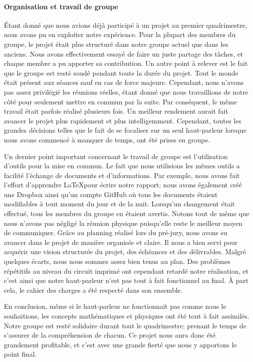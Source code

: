 \paragraph{Organisation et travail de groupe}
Étant donné que nous avions déjà participé à un projet au premier quadrimestre, nous avons pu en exploiter 
notre expérience.  Pour la plupart des membres du groupe, le projet était plus structuré dans notre groupe
actuel que dans les anciens. Nous avons effectivement essayé de faire un juste partage des tâches, et chaque
membre a pu apporter sa contribution. Un autre point à relever est le fait que le groupe est resté soudé 
pendant toute la durée du projet. Tout le monde était présent aux séances sauf en cas de force majeure. 
Cependant, nous n'avons pas assez privilégié les réunions réelles, étant donné que nous travaillions de notre
côté pour seulement mettre en commun par la suite. Par conséquent, le même travail était parfois réalisé
plusieurs fois. Un meilleur rendement aurait fait avancer le projet plus rapidement et plus intelligemment.
Cependant, toutes les grandes décisions telles que le fait de se focaliser sur un seul haut-parleur lorsque 
nous avons commencé à manquer de temps, ont été prises en groupe.

Un dernier point important concernant le travail de groupe est l'utilisation d'outils pour la mise en commun.
Le fait que nous utilisions les mêmes outils a facilité l’échange de documents et d’informations. 
Par exemple, nous avons fait l’effort d’apprendre \LaTeX pour écrire notre rapport; nous avons également créé
une Dropbox ainsi qu’un compte GitHub où tous les documents étaient modifiables à tout moment du jour et de 
la nuit. Lorsqu'un changement était effectué, tous les membres du groupe en étaient avertis. 
Notons tout de même que nous n'avons pas négligé la réunion physique puisqu'elle reste 
le meilleur moyen de communiquer. 
Grâce au planning réalisé lors du pré-jury, nous avons su avancer dans le projet de manière organisée et 
claire. Il nous a bien servi pour acquérir une vision structurée du projet, des échéances
et des délivrables. Malgré quelques écarts, nous nous sommes assez bien tenus au plan. Des problèmes répétitifs 
au niveau du circuit imprimé ont cependant retardé notre réalisation, et c'est ainsi que notre haut-parleur 
n'est pas tout à fait fonctionnel au final. À part cela, le cahier des charges a été respecté dans son ensemble.

En conclusion, même si le haut-parleur ne fonctionnait pas comme nous le souhaitions, les concepts 
mathématiques et physiques ont été tout à fait assimilés. Notre groupe est resté solidaire durant tout 
le quadrimestre; prenant le temps de s'assurer de la compréhension de chacun. Ce projet nous aura donc été
grandement profitable, et c'est avec une grande fierté que nous y apportons le point final.


